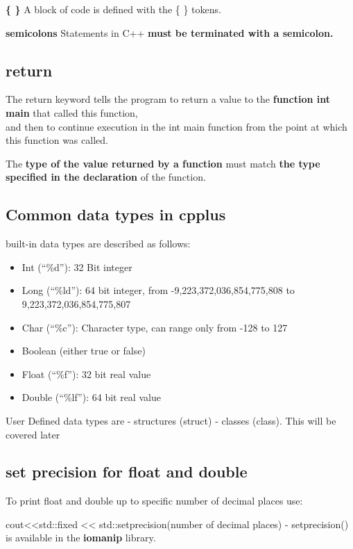 \documentclass[
]{article}
\providecommand{\tightlist}{%
  \setlength{\itemsep}{0pt}\setlength{\parskip}{0pt}}
\begin{document}
\textbf{\{ \}} A block of code is defined with the \{ \} tokens.

\textbf{semicolons} Statements in C++ \textbf{must be terminated with a
semicolon.}

\subsection{return}\label{return}

The return keyword tells the program to return a value to the
\textbf{function int main} that called this function,\\
and then to continue execution in the int main function from the point
at which this function was called.

The \textbf{type of the value returned by a function} must match
\textbf{the type specified in the declaration} of the function.

\subsection{Common data types in
cpplus}\label{common-data-types-in-cpplus}

built-in data types are described as follows:

\begin{itemize}
\tightlist
\item
  Int (``\%d''): 32 Bit integer
\item
  Long (``\%ld''): 64 bit integer, from -9,223,372,036,854,775,808 to
  9,223,372,036,854,775,807
\item
  Char (``\%c''): Character type, can range only from -128 to 127
\item
  Boolean (either true or false)
\item
  Float (``\%f''): 32 bit real value
\item
  Double (``\%lf''): 64 bit real value
\end{itemize}

User Defined data types are - structures (struct) - classes (class).
This will be covered later

\subsection{set precision for float and
double}\label{set-precision-for-float-and-double}

To print float and double up to specific number of decimal places use:

cout\textless\textless std::fixed \textless\textless{}
std::setprecision(number of decimal places) - setprecision() is
available in the \textbf{iomanip} library.
\end{document}
